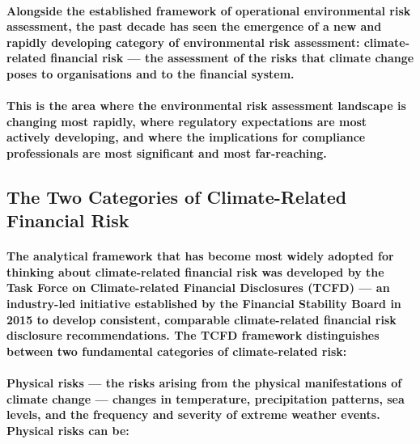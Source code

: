 \paragraph{Alongside the established framework of operational environmental risk assessment, the past decade has seen the emergence of a new and rapidly developing category of environmental risk assessment: \textbf{climate-related financial risk} — the assessment of the risks that climate change poses to organisations and to the financial system.}
\paragraph{This is the area where the environmental risk assessment landscape is changing most rapidly, where regulatory expectations are most actively developing, and where the implications for compliance professionals are most significant and most far-reaching.}

\subsection{The Two Categories of Climate-Related Financial Risk}
\paragraph{The analytical framework that has become most widely adopted for thinking about climate-related financial risk was developed by the \textbf{Task Force on Climate-related Financial Disclosures (TCFD)} — an industry-led initiative established by the Financial Stability Board in 2015 to develop consistent, comparable climate-related financial risk disclosure recommendations. The TCFD framework distinguishes between two fundamental categories of climate-related risk:}
\paragraph{\textbf{Physical risks} — the risks arising from the physical manifestations of climate change — changes in temperature, precipitation patterns, sea levels, and the frequency and severity of extreme weather events. Physical risks can be:}
\begin{itemize}
\end{itemize}

